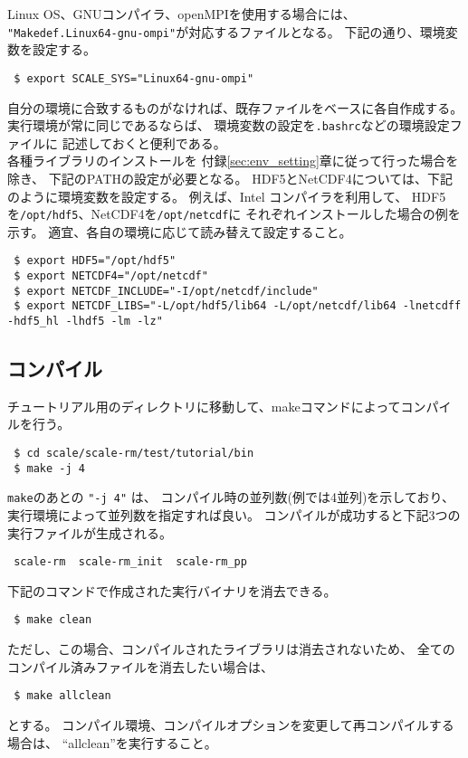 Linux OS、GNUコンパイラ、openMPIを使用する場合には、
\verb|"Makedef.Linux64-gnu-ompi"|が対応するファイルとなる。
下記の通り、環境変数を設定する。
\begin{verbatim}
 $ export SCALE_SYS="Linux64-gnu-ompi"
\end{verbatim}
自分の環境に合致するものがなければ、既存ファイルをベースに各自作成する。
実行環境が常に同じであるならば、
環境変数の設定を\verb|.bashrc|などの環境設定ファイルに
記述しておくと便利である。\\


各種ライブラリのインストールを
付録\ref{sec:env_setting}章に従って行った場合を除き、
下記のPATHの設定が必要となる。
HDF5とNetCDF4については、下記のように環境変数を設定する。
例えば、Intel コンパイラを利用して、
HDF5を\verb"/opt/hdf5"、NetCDF4を\verb|/opt/netcdf|に
それぞれインストールした場合の例を示す。
適宜、各自の環境に応じて読み替えて設定すること。
\begin{verbatim}
 $ export HDF5="/opt/hdf5"
 $ export NETCDF4="/opt/netcdf"
 $ export NETCDF_INCLUDE="-I/opt/netcdf/include"
 $ export NETCDF_LIBS="-L/opt/hdf5/lib64 -L/opt/netcdf/lib64 -lnetcdff -hdf5_hl -lhdf5 -lm -lz"
\end{verbatim}


\subsection{コンパイル}
\label{sec:compile}

チュートリアル用のディレクトリに移動して、makeコマンドによってコンパイルを行う。
\begin{verbatim}
 $ cd scale/scale-rm/test/tutorial/bin
 $ make -j 4
\end{verbatim}
\verb|make|のあとの \verb|"-j 4"| は、
コンパイル時の並列数(例では4並列)を示しており、
実行環境によって並列数を指定すれば良い。
コンパイルが成功すると下記3つの実行ファイルが生成される。
\begin{verbatim}
 scale-rm  scale-rm_init  scale-rm_pp
\end{verbatim}


下記のコマンドで作成された実行バイナリを消去できる。
\begin{verbatim}
 $ make clean
\end{verbatim}
ただし、この場合、コンパイルされたライブラリは消去されないため、
全てのコンパイル済みファイルを消去したい場合は、
\begin{verbatim}
 $ make allclean
\end{verbatim}
とする。
コンパイル環境、コンパイルオプションを変更して再コンパイルする場合は、
``allclean''を実行すること。


